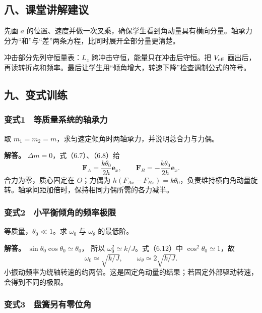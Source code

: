 \documentclass[12pt,a4paper,fontset=fandol]{ctexart}
\begin{document}
\subsection{八、课堂讲解建议}\label{ux516bux8bfeux5802ux8bb2ux89e3ux5efaux8bae-5}

先画 \(a\)
的位置、速度并做一次叉乘，确保学生看到角动量具有横向分量。轴承力分为``和''与``差''两条方程，比同时展开全部分量更清楚。

冲击部分先列守恒量表：\(L_z\) 跨冲击守恒，能量只在冲击后守恒。把
\(V_{\rm eff}\)
画出后，再读转折点和频率。最后让学生用``倾角增大，转速下降''检查调制公式的符号。

\subsection{九、变式训练}\label{ux4e5dux53d8ux5f0fux8badux7ec3-5}

\subsubsection{变式1　等质量系统的轴承力}\label{ux53d8ux5f0f1-ux7b49ux8d28ux91cfux7cfbux7edfux7684ux8f74ux627fux529b}

取 \(m_1=m_2=m\)，求匀速定倾角时两轴承力，并说明总合力与力偶。

\textbf{解答。} \(\Delta m=0\)，式（6.7）、（6.8）给 \[
\boxed{\mathbf F_A=\frac{k\theta_0}{2h}\mathbf e_x,\qquad
\mathbf F_B=-\frac{k\theta_0}{2h}\mathbf e_x.}
\] 合力为零，质心固定在 \(O\)；力偶为
\(h(F_{Ax}-F_{Bx})=k\theta_0\)，负责维持横向角动量旋转。轴承间距加倍时，保持相同力偶所需的各力减半。

\subsubsection{变式2　小平衡倾角的频率极限}\label{ux53d8ux5f0f2-ux5c0fux5e73ux8861ux503eux89d2ux7684ux9891ux7387ux6781ux9650}

等质量，\(\theta_0\ll1\)。求 \(\omega_0\) 与 \(\omega_\theta\)
的最低阶。

\textbf{解答。} \(\sin\theta_0\cos\theta_0\simeq\theta_0\)， 所以
\(\omega_0^2\simeq k/J\)。式（6.12）中 \(\cos^2\theta_0\simeq1\)，故 \[
\boxed{\omega_0\simeq\sqrt{k/J},\qquad
\omega_\theta\simeq2\sqrt{k/J}.}
\]
小振动频率为绕轴转速的约两倍。这是固定角动量的结果；若固定外部驱动转速，会得到不同的极限。

\subsubsection{变式3　盘簧另有零位角}\label{ux53d8ux5f0f3-ux76d8ux7c27ux53e6ux6709ux96f6ux4f4dux89d2}
\end{document}
